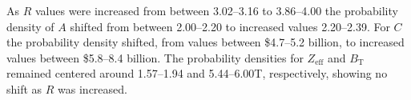 \documentclass[journal]{IEEEtran}
\begin{document}
As $R$ values were increased from between 3.02--3.16 to 3.86--4.00 the probability density of $A$ shifted from between 2.00--2.20 to increased values 2.20--2.39. For $C$ the probability density shifted, from values between \$4.7--5.2 billion, to increased values between \$5.8--8.4 billion. The probability densities for $Z_{\text{eff}}$ and $B_{\text{T}}$ remained centered around 1.57--1.94 and 5.44--6.00T, respectively, showing no shift as $R$ was increased. 




\end{document}
